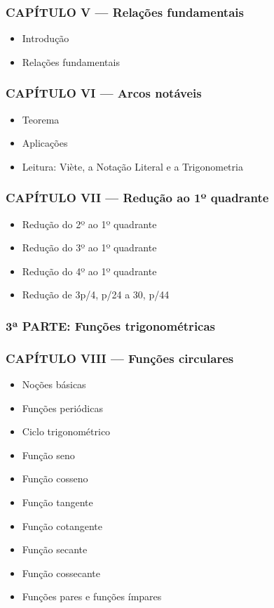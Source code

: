 \documentclass[a4paper,12pt]{article}[abntex2]
\begin{document}
\subsubsection*{CAPÍTULO V — Relações fundamentais}

\begin{itemize}
\item Introdução
\item Relações fundamentais
\end{itemize}
\subsubsection*{CAPÍTULO VI — Arcos notáveis}

\begin{itemize}
\item Teorema
\item Aplicações
\item Leitura: Viète, a Notação Literal e a Trigonometria
\end{itemize}
\subsubsection*{CAPÍTULO VII — Redução ao 1º quadrante}

\begin{itemize}
\item Redução do 2º ao 1º quadrante
\item Redução do 3º ao 1º quadrante
\item Redução do 4º ao 1º quadrante
\item Redução de 3p/4, p/24 a 30, p/44
\end{itemize}
\subsubsection*{3ª PARTE: Funções trigonométricas}

\subsubsection*{CAPÍTULO VIII — Funções circulares}

\begin{itemize}
\item Noções básicas
\item Funções periódicas
\item Ciclo trigonométrico
\item Função seno
\item Função cosseno
\item Função tangente
\item Função cotangente
\item Função secante
\item Função cossecante
\item Funções pares e funções ímpares
\end{itemize}
\end{document}
